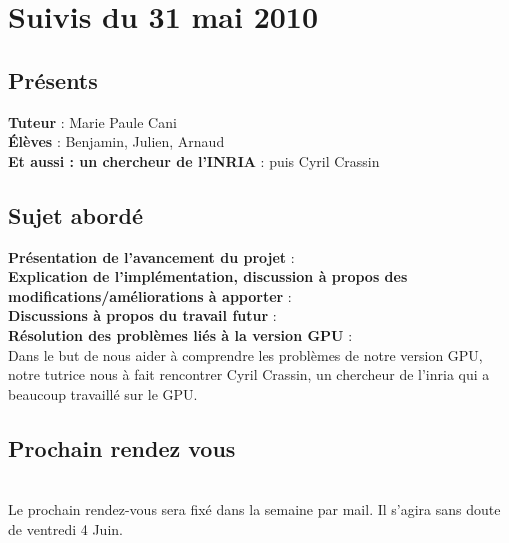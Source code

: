 \documentclass[a4paper,10pt]{article}
\begin{document}
\section{Suivis du  31 mai 2010}
\subsection{Présents}
\textbf{Tuteur} : Marie Paule Cani\\
\textbf{Élèves} : Benjamin, Julien, Arnaud \\
\textbf{Et aussi : un chercheur de l'INRIA} : puis Cyril Crassin \\
\subsection{Sujet abordé}
\textbf{Présentation de l'avancement du projet} :  \\
\textbf{Explication de l'implémentation, discussion à propos des modifications/améliorations à apporter} :  \\
\textbf{Discussions à propos du travail futur} :  \\
\textbf{Résolution des problèmes liés à la version GPU} :  \\
    Dans le but de nous aider à comprendre les problèmes de notre version GPU, 
    notre tutrice nous à fait rencontrer Cyril Crassin, un chercheur de l'inria qui
    a beaucoup travaillé sur le GPU. 

\subsection{Prochain rendez vous}\\
Le prochain rendez-vous sera fixé dans la semaine par mail. Il s'agira sans doute de ventredi 4 Juin.




\end{document}
